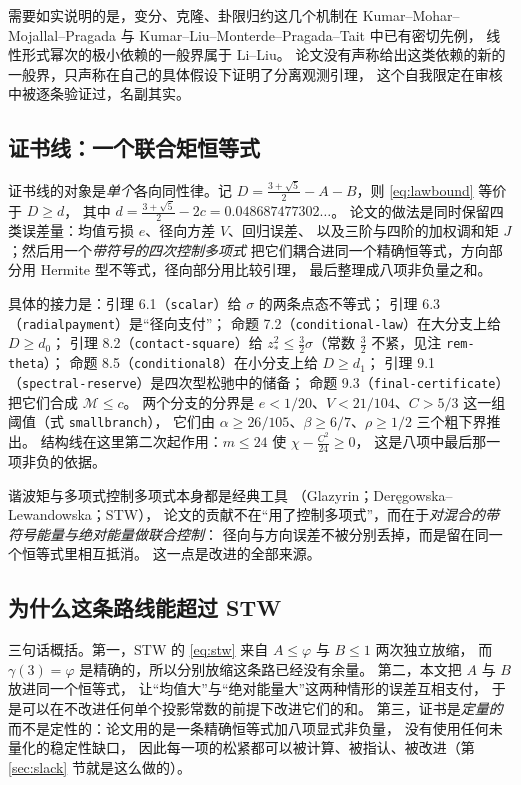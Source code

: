 \documentclass[UTF8,11pt]{ctexart}
\newcommand{\M}{\mathcal{M}}
\newcommand{\file}[1]{\texttt{#1}}
\begin{document}
需要如实说明的是，变分、克隆、卦限归约这几个机制在
Kumar--Mohar--Mojallal--Pragada 与 Kumar--Liu--Monterde--Pragada--Tait 中已有密切先例，
线性形式幂次的极小依赖的一般界属于 Li--Liu。
论文没有声称给出这类依赖的新的一般界，只声称在自己的具体假设下证明了分离观测引理，
这个自我限定在审核中被逐条验证过，名副其实。

\subsection{证书线：一个联合矩恒等式}

证书线的对象是\emph{单个}各向同性律。记
$D=\frac{3+\sqrt5}{2}-A-B$，则 \eqref{eq:lawbound} 等价于 $D\ge d$，
其中 $d=\frac{3+\sqrt5}{2}-2c=0.048687477302\ldots$。
论文的做法是同时保留四类误差量：均值亏损 $e$、径向方差 $V$、回归误差、
以及三阶与四阶的加权调和矩 $J$；然后用一个\emph{带符号的四次控制多项式}
把它们耦合进同一个精确恒等式，方向部分用 Hermite 型不等式，径向部分用比较引理，
最后整理成八项非负量之和。

具体的接力是：引理 6.1（\file{scalar}）给 $\sigma$ 的两条点态不等式；
引理 6.3（\file{radialpayment}）是``径向支付''；
命题 7.2（\file{conditional-law}）在大分支上给 $D\ge d_0$；
引理 8.2（\file{contact-square}）给 $z_*^2\le\frac32\sigma$（常数 $\frac32$ 不紧，见注 \file{rem-theta}）；
命题 8.5（\file{conditional8}）在小分支上给 $D\ge d_1$；
引理 9.1（\file{spectral-reserve}）是四次型松驰中的储备；
命题 9.3（\file{final-certificate}）把它们合成 $\M\le c$。
两个分支的分界是 $e<1/20$、$V<21/104$、$C>5/3$ 这一组阈值（式 \file{smallbranch}），
它们由 $\alpha\ge26/105$、$\beta\ge6/7$、$\rho\ge1/2$ 三个粗下界推出。
结构线在这里第二次起作用：$m\le24$ 使 $\chi-\frac{C^2}{24}\ge0$，
这是八项中最后那一项非负的依据。

谐波矩与多项式控制多项式本身都是经典工具
（Glazyrin；Der\k{e}gowska--Lewandowska；STW），
论文的贡献不在``用了控制多项式''，而在于\emph{对混合的带符号能量与绝对能量做联合控制}：
径向与方向误差不被分别丢掉，而是留在同一个恒等式里相互抵消。
这一点是改进的全部来源。

\subsection{为什么这条路线能超过 STW}

三句话概括。第一，STW 的 \eqref{eq:stw} 来自 $A\le\varphi$ 与 $B\le1$ 两次独立放缩，
而 $\gamma(3)=\varphi$ 是精确的，所以分别放缩这条路已经没有余量。
第二，本文把 $A$ 与 $B$ 放进同一个恒等式，
让``均值大''与``绝对能量大''这两种情形的误差互相支付，
于是可以在不改进任何单个投影常数的前提下改进它们的和。
第三，证书是\emph{定量的}而不是定性的：论文用的是一条精确恒等式加八项显式非负量，
没有使用任何未量化的稳定性缺口，
因此每一项的松紧都可以被计算、被指认、被改进（第 \ref{sec:slack} 节就是这么做的）。
\end{document}
